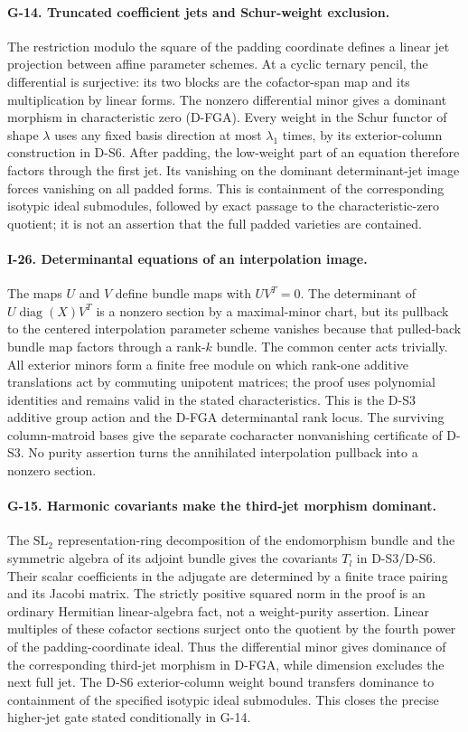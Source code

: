 \documentclass[11pt,a4paper]{article}
\theoremstyle{definition}\newtheorem{definition}{Definition}
\begin{document}
\paragraph{G-14. Truncated coefficient jets and Schur-weight exclusion.}
The restriction modulo the square of the padding coordinate defines a linear
jet projection between affine parameter schemes. At a cyclic ternary pencil,
the differential is surjective: its two blocks are the cofactor-span map and
its multiplication by linear forms. The nonzero differential minor gives a
dominant morphism in characteristic zero (D-FGA). Every weight in the Schur
functor of shape $\lambda$ uses any fixed basis direction at most
$\lambda_1$ times, by its exterior-column construction in D-S6. After padding,
the low-weight part of an equation therefore factors through the first jet.
Its vanishing on the dominant determinant-jet image forces vanishing on all
padded forms. This is containment of the corresponding isotypic ideal
submodules, followed by exact passage to the characteristic-zero quotient;
it is not an assertion that the full padded varieties are contained.

\paragraph{I-26. Determinantal equations of an interpolation image.}
The maps $U$ and $V$ define bundle maps with $UV^T=0$. The determinant of
$U\operatorname{diag}(X)V^T$ is a nonzero section by a maximal-minor chart,
but its pullback to the centered interpolation parameter scheme vanishes
because that pulled-back bundle map factors through a rank-$k$ bundle.
The common center acts trivially. All exterior minors form a finite free
module on which rank-one additive translations act by commuting unipotent
matrices; the proof uses polynomial identities and remains valid in the
stated characteristics. This is the D-S3 additive group action and the
D-FGA determinantal rank locus. The surviving column-matroid bases give the
separate cocharacter nonvanishing certificate of D-S3. No purity assertion
turns the annihilated interpolation pullback into a nonzero section.


\paragraph{G-15. Harmonic covariants make the third-jet morphism dominant.}
The $\mathrm{SL}_2$ representation-ring decomposition of the endomorphism
bundle and the symmetric algebra of its adjoint bundle gives the covariants
$T_l$ in D-S3/D-S6. Their scalar coefficients in the adjugate are determined
by a finite trace pairing and its Jacobi matrix. The strictly positive
squared norm in the proof is an ordinary Hermitian linear-algebra fact,
not a weight-purity assertion. Linear multiples of these cofactor sections
surject onto the quotient by the fourth power of the padding-coordinate
ideal. Thus the differential minor gives dominance of the corresponding
third-jet morphism in D-FGA, while dimension excludes the next full jet.
The D-S6 exterior-column weight bound transfers dominance to containment
of the specified isotypic ideal submodules. This closes the precise
higher-jet gate stated conditionally in G-14.
\end{document}
